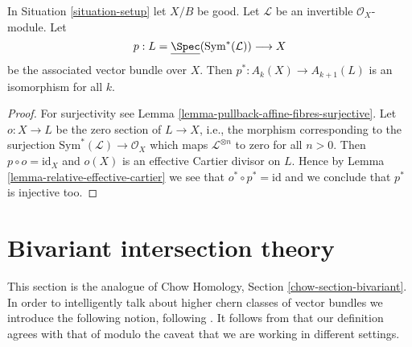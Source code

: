 \begin{lemma}
\label{lemma-linebundle}
In Situation \ref{situation-setup} let $X/B$ be good.
Let $\mathcal{L}$ be an invertible $\mathcal{O}_X$-module.
Let
$$
p :
L = \underline{\Spec}(\text{Sym}^*(\mathcal{L}))
\longrightarrow
X
$$
be the associated vector bundle over $X$.
Then $p^* : A_k(X) \to A_{k + 1}(L)$ is an isomorphism for all $k$.
\end{lemma}

\begin{proof}
For surjectivity see Lemma \ref{lemma-pullback-affine-fibres-surjective}.
Let $o : X \to L$ be the zero section of $L \to X$, i.e., the morphism
corresponding to the surjection $\text{Sym}^*(\mathcal{L}) \to \mathcal{O}_X$
which maps $\mathcal{L}^{\otimes n}$ to zero for all $n > 0$.
Then $p \circ o = \text{id}_X$ and $o(X)$ is an effective
Cartier divisor on $L$. Hence by Lemma \ref{lemma-relative-effective-cartier}
we see that $o^* \circ p^* = \text{id}$ and we conclude that $p^*$ is
injective too.
\end{proof}























\section{Bivariant intersection theory}
\label{section-bivariant}

\noindent
This section is the analogue of
Chow Homology, Section \ref{chow-section-bivariant}.
In order to intelligently talk about higher chern classes of vector
bundles we introduce the following notion, following \cite{FM}.
It follows from \cite[Theorem 17.1]{F} that our definition agrees
with that of \cite{F} modulo the caveat that we are working in different
settings.


